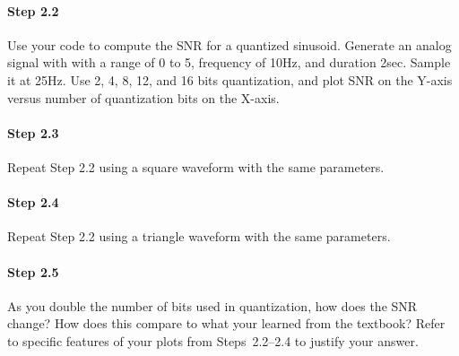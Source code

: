   \paragraph{Step 2.2} Use your code to compute the SNR for a
  quantized sinusoid. Generate an analog signal with with a range of 0
  to 5, frequency of 10Hz, and duration 2sec. Sample it at 25Hz. Use
  2, 4, 8, 12, and 16 bits quantization, and plot SNR on the Y-axis
  versus number of quantization bits on the X-axis.

  \paragraph{Step 2.3} Repeat Step 2.2 using a square waveform with
  the same parameters.

  \paragraph{Step 2.4} Repeat Step 2.2 using a triangle waveform with
  the same parameters.

  \paragraph{Step 2.5} As you double the number of bits used in
  quantization, how does the SNR change? How does this compare to what
  your learned from the textbook? Refer to specific features of your
  plots from Steps~2.2--2.4 to justify your answer.
